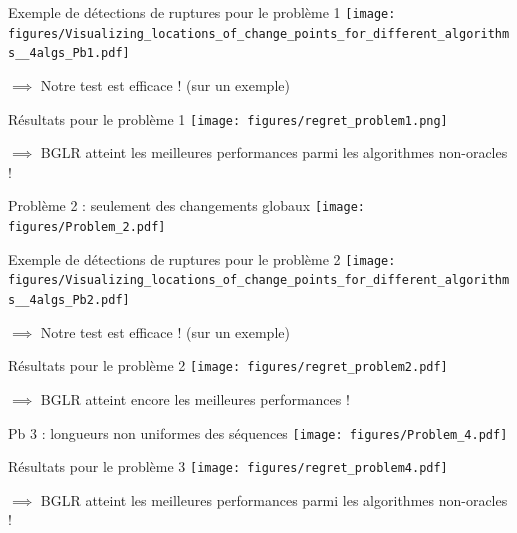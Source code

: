 \documentclass[11pt,french,ignorenonframetext,]{beamer}
\begin{document}
\begin{frame}[plain]{Exemple de détections de ruptures pour le problème 1}
  \centering
  \texttt{[image: figures/Visualizing\_locations\_of\_change\_points\_for\_different\_algorithms\_\_4algs\_Pb1.pdf]}

  $\implies$ Notre test est efficace !
  (sur un exemple)
\end{frame}

\begin{frame}[plain]{Résultats pour le problème 1}
  \centering
  \texttt{[image: figures/regret\_problem1.png]}

  $\implies$ BGLR atteint les meilleures performances parmi les algorithmes non-oracles \dCooley{} !
\end{frame}


\begin{frame}[plain]{Problème 2 : seulement des changements globaux}
  \centering
  \texttt{[image: figures/Problem\_2.pdf]}
\end{frame}

\begin{frame}[plain]{Exemple de détections de ruptures pour le problème 2}
  \centering
  \texttt{[image: figures/Visualizing\_locations\_of\_change\_points\_for\_different\_algorithms\_\_4algs\_Pb2.pdf]}

  $\implies$ Notre test est efficace !
  (sur un exemple)
\end{frame}

\begin{frame}[plain]{Résultats pour le problème 2}
  \centering
  \texttt{[image: figures/regret\_problem2.pdf]}

  $\implies$ BGLR atteint encore les meilleures performances \dCooley{} !
\end{frame}


\begin{frame}[plain]{Pb 3 : longueurs non uniformes des séquences}
  \centering
  \texttt{[image: figures/Problem\_4.pdf]}
\end{frame}

\begin{frame}[plain]{Résultats pour le problème 3}
  \centering
  \texttt{[image: figures/regret\_problem4.pdf]}

  $\implies$ BGLR atteint les meilleures performances parmi les algorithmes non-oracles \dCooley{} !
\end{frame}


\end{document}
